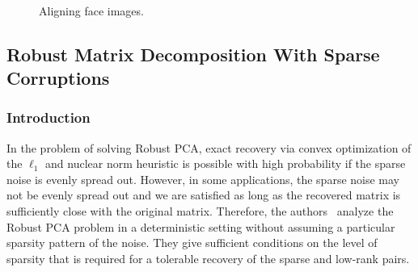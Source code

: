 \begin{figure}[h!]
  ~

  \caption{Aligning face images.}
  \label{fig:rasl:example}
\end{figure}



\subsection{Robust Matrix Decomposition With Sparse Corruptions}
\subsubsection{Introduction}

In the problem of solving Robust PCA, exact recovery via convex optimization of the $\ell_{1}$ and nuclear norm heuristic is possible with high probability if the sparse noise is evenly spread out. However, in some applications, the sparse noise may not be evenly spread out and we are satisfied as long as the recovered matrix is sufficiently close with the original matrix. Therefore, the authors~\cite{Hsu:2011ys} analyze the Robust PCA problem in a deterministic setting without assuming a particular sparsity pattern of the noise. They give sufficient conditions on the level of sparsity that is required for a tolerable recovery of the sparse and low-rank pairs.


